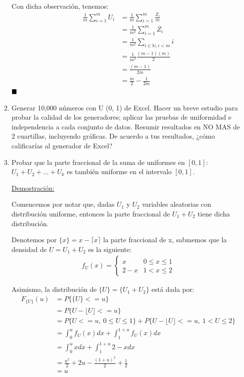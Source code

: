 \documentclass[12 pt]{article}\usepackage[]{graphicx}\usepackage[]{color}
\renewcommand\qedsymbol{$\null\hfill\blacksquare$}
\begin{document}
\begin{enumerate}
    Con dicha observación, tenemos: 
    \begin{align*}
        \frac{1}{m}\sum_{i=1}^{m} U_i &= \frac{1}{m}\sum_{i=1}^{m} \frac{Z_i}{m} \\
        &= \frac{1}{m^2}\sum_{i=1}^{m}  Z_i  \\
        &= \frac{1}{m^2}\sum_{i\in\mathbb{N}, i<m} i \\
        &= \frac{1}{m^2} \frac{(m-1)(m)}{2} \\
        &= \frac{(m-1)}{2m} \\
        &= \frac{m}{2} - \frac{1}{2m}
    \end{align*}
    \qedsymbol
    
    \newpage
    
    \item Generar 10,000 números con U (0, 1) de Excel. Hacer un breve estudio para probar la calidad de los generadores; aplicar las pruebas de uniformidad e independencia a cada conjunto de datos. Resumir resultados en NO MAS de 2 cuartillas, incluyendo gráficas. De acuerdo a tus resultados, ¿cómo calificarías al generador de Excel?
    
    \newpage
    \item Probar que la parte fraccional de la suma de uniformes en $[0,1]$: $U_1 + U_2 + ... + U_k$ es también uniforme en el intervalo $[0,1]$.
    
    \underline{Demostración:} 
    
    Comencemos por notar que, dadas $U_1$ y $U_2$ variables aleatorias con distribución uniforme, entonces la parte fraccional de $U_1 + U_2$ tiene dicha distribución.
    
    Denotemos por $\{x\} = x -  \lceil x \rceil $ la parte fraccional de x, sabmemos que la densidad de $U = U_1 + U_2$ es la siguiente: 
    \begin{align*}
        f_U(x) = \begin{cases} 
              x & 0 \leq x \leq 1\\
              2-x & 1 < x \leq 2
           \end{cases}
    \end{align*}
    
    Asimismo, la distribución de $\{U\} = \{U_1 + U_2\}$ está dada por:
    \begin{align*}
        F_{\{U\}}(u) &= P\{ \{U\} <= u\} \\
        &= P\{ U - \lfloor U \rfloor <= u\} \\
        &= P\{ U <= u,\ 0 \leq U \leq 1 \} + P\{ U - \lfloor U \rfloor <= u,\ 1 < U \leq 2 \} \\
        &= \int_0^u f_U(x) dx + \int_1^{1+u} f_U(x) dx \\
        &= \int_0^u x dx + \int_1^{1+u} 2-x dx\\
        &= \frac{u^2}{2} + 2u - \frac{(1+u)^2}{2} + \frac{1}{2}\\
        &= u
    \end{align*}
    

\end{enumerate}
\end{document}
